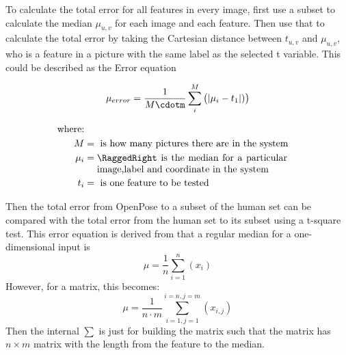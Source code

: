 \par

To calculate the total error for all features in every image, first use a subset to calculate the median \(\mu_{u,v}\) for each image and each feature.
Then use that to calculate the total error by taking the Cartesian distance between \(t_{u,v}\) and \(\mu_{u,v}\), who is a feature in a picture with the same label as the selected t variable.
This could be described as the Error equation

\begin{equation} %
\label{eq:impl:muerror}
\mu_{error}=\frac{1}{M\cdotm}\sum_{i}^M\big(|\mu_i - t_1|)\big)
\end{equation}

\begin{align*}
    \text{where:}\\
    M &= \text{ is how many pictures there are in the system}\\
    \mu_{i} &= \parbox[t]{7cm}{\RaggedRight is the median for a particular image,label and coordinate in the system}\\
    t_{i} &= \text{ is one feature to be tested}
\end{align*}
\par
Then the total error from OpenPose to a subset of the human set can be compared with the total error from the human set to its subset using a t-square test.
This error equation is derived from that a regular median for a one-dimensional input is
\[
\mu = \frac{1}{n}\sum_{i=1}^n (x_i)
\]
However, for a matrix, this becomes:
\[
\mu = \frac{1}{n\cdot m} \sum_{i=1,j=1}^{i=n,j=m}(x_{i,j})
\]
Then the internal \(\sum\) is just for building the matrix such that the matrix has \(n\times m\) matrix with the length from the feature to the median.






